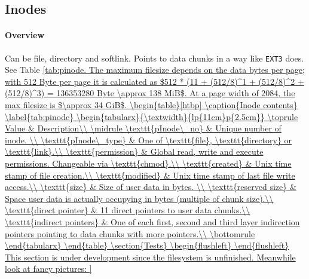 \subsection{Inodes}
\label{inode}
\paragraph{Overview}
Can be file, directory and softlink. Points to data chunks in a way like \texttt{EXT3} does. See Table \ref{tab:pinode. The maximum filesize depends on the data bytes per page; with 512 Byte per page it is calculated as 
$512 * (11 + (512/8)^1 + (512/8)^2 + (512/8)^3) = 136353280 Byte \approx 138 MiB$. At a page width of 2084, the max filesize is $\approx 34 GiB$.
\begin{table}[htbp]
	\caption{Inode contents}
	\label{tab:pinode}
	\begin{tabularx}{\textwidth}{lp{11cm}p{2.5cm}}
		\toprule
		Value & Description\\
		\midrule
		\texttt{pInode\_no} & Unique number of inode. \\
		\texttt{pInode\_type} & One of \texttt{file}, \texttt{directory} or \texttt{link}.\\
		\texttt{permission} & Global read, write and execute permissions. Changeable via \texttt{chmod}.\\
		\texttt{created} & Unix time stamp of file creation.\\
		\texttt{modified} & Unix time stamp of last file write access.\\
		\texttt{size} & Size of user data in bytes. \\
		\texttt{reserved size} & Space user data is actually occupying in bytes (multiple of chunk size).\\
		\texttt{direct pointer} & 11 direct pointers to user data chunks.\\
		\texttt{indirect pointers} & One of each first, second and third layer indirection pointers pointing to data chunks with more pointers.\\
		\bottomrule
	\end{tabularx}
\end{table} 

\section{Tests}
\begin{flushleft}
	
\end{flushleft}
This section is under development since the filesystem is unfinished. Meanwhile look at fancy pictures:

}
